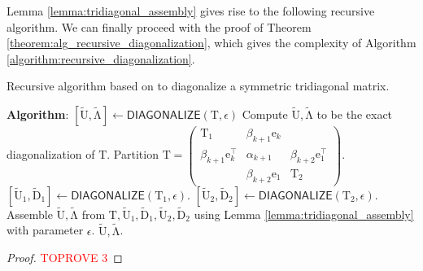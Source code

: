 \documentclass{article}
\newcommand\vece{\boldsymbol{\mathrm{e}}}
\newcommand\matT{\boldsymbol{\mathrm{T}}}
\newcommand\matDtilde{\widetilde{\boldsymbol{\mathrm{D}}}}
\newcommand\matUtilde{\widetilde{\boldsymbol{\mathrm{U}}}}
\newcommand\matLambdatilde{\widetilde{\boldsymbol{\mathrm{\Lambda}}}}
\newcommand{\DIAGONALIZE}{\mathsf{DIAGONALIZE}}
\begin{document}
Lemma \ref{lemma:tridiagonal_assembly} gives rise to the following recursive algorithm. We can finally proceed with the proof of Theorem \ref{theorem:alg_recursive_diagonalization}, which gives the complexity of Algorithm \ref{algorithm:recursive_diagonalization}.
\begin{algorithm}[htb]
    \caption{Recursive algorithm based on \cite{gu1995divide} to diagonalize a symmetric tridiagonal matrix.}
    \label{algorithm:recursive_diagonalization}
    \small
    \begin{algorithmic}[1]
        \Statex \textbf{Algorithm}: $[\matUtilde,\matLambdatilde]\leftarrow \DIAGONALIZE(\matT,\epsilon)$
            \State Compute $\matUtilde,\matLambdatilde$ to be the  exact diagonalization of $\matT$.
        \Else {\bf :}
            \State Partition $\matT = \begin{pmatrix}
                \matT_1 & \beta_{k+1}\vece_k & \\
                \beta_{k+1}\vece_k^\top & \alpha_{k+1} & \beta_{k+2}\vece_1^\top \\
                 & \beta_{k+2}\vece_1 & \matT_2
            \end{pmatrix}$.
            \State $[\matUtilde_1,\matDtilde_1]\leftarrow \DIAGONALIZE(\matT_1,\epsilon)$.
            \State $[\matUtilde_2,\matDtilde_2]\leftarrow \DIAGONALIZE(\matT_2,\epsilon)$.
            \State Assemble $\matUtilde,\matLambdatilde$ from $\matT,\matUtilde_1,\matDtilde_1,\matUtilde_2,\matDtilde_2$ using Lemma \ref{lemma:tridiagonal_assembly} with parameter $\epsilon$.
        \EndIf
        \State \Return $\matUtilde,\matLambdatilde$.
    \end{algorithmic}
\end{algorithm}


\begin{proof}\textcolor{red}{TOPROVE 3}\end{proof}
\end{document}
